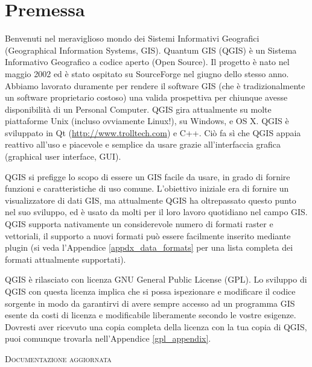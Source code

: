 
\section{Premessa}\label{label_forward}
\setcounter{page}{1}


Benvenuti nel meraviglioso mondo dei Sistemi Informativi Geografici (Geographical Information Systems, GIS). Quantum GIS (QGIS) è un Sistema
Informativo Geografico a codice aperto (Open Source). Il progetto
è nato nel maggio 2002 ed è stato ospitato su SourceForge
nel giugno dello stesso anno. Abbiamo lavorato duramente per rendere
il software GIS (che è tradizionalmente un software proprietario costoso)
una valida prospettiva per chiunque avesse disponibilità di un Personal
Computer. QGIS gira attualmente su molte piattaforme Unix (incluso ovviamente Linux!), su Windows,
e OS X. QGIS è sviluppato in Qt (\url{http://www.trolltech.com})
e C++. Ciò fa sì che QGIS appaia reattivo all'uso e piacevole e
semplice da usare grazie all'interfaccia grafica (graphical user interface,
GUI).

QGIS si prefigge lo scopo di essere un GIS facile da usare, in grado
di fornire funzioni e caratteristiche di uso comune. L’obiettivo iniziale
era di fornire un visualizzatore di dati GIS, ma attualmente QGIS ha oltrepassato questo
punto nel suo sviluppo, ed è usato da molti per il loro lavoro quotidiano nel campo GIS.
QGIS supporta nativamente un considerevole numero di formati raster e vettoriali,
il supporto a nuovi formati può essere facilmente inserito mediante
plugin (si veda l'Appendice \ref{appdx_data_formats} per una lista
completa dei formati attualmente supportati).

QGIS è rilasciato con licenza GNU General Public License (GPL). Lo
sviluppo di QGIS con questa licenza implica che si possa ispezionare
e modificare il codice sorgente in modo da garantirvi di avere sempre accesso
ad un programma GIS esente da costi di licenza e modificabile liberamente secondo le
vostre esigenze. Dovresti aver ricevuto una copia completa della licenza
con la tua copia di QGIS, puoi comunque trovarla nell'Appendice \ref{gpl_appendix}.



\begin{Tip}\caption{\textsc{Documentazione aggiornata}}
\end{Tip}

